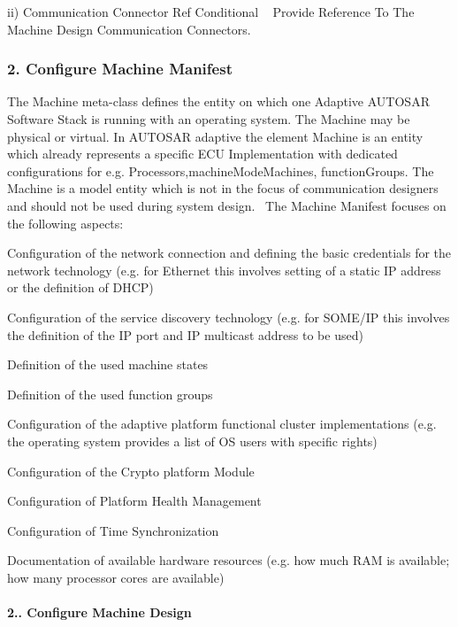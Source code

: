 ii) Communication Connector Ref Conditional ~\newline
 Provide Reference To The Machine Design Communication Connectors.

 \subsubsection*{2. Configure Machine Manifest}

The Machine meta-\/class defines the entity on which one Adaptive A\+U\+T\+O\+S\+AR Software Stack is running with an operating system. The Machine may be physical or virtual. In A\+U\+T\+O\+S\+AR adaptive the element Machine is an entity which already represents a specific E\+CU Implementation with dedicated configurations for e.\+g. Processors,machine\+Mode\+Machines, function\+Groups. The Machine is a model entity which is not in the focus of communication designers and should not be used during system design.~\newline
 The Machine Manifest focuses on the following aspects\+:
\begin{DoxyItemize}
\item Configuration of the network connection and defining the basic credentials for the network technology (e.\+g. for Ethernet this involves setting of a static IP address or the definition of D\+H\+CP)
\item Configuration of the service discovery technology (e.\+g. for S\+O\+M\+E/\+IP this involves the definition of the IP port and IP multicast address to be used)
\item Definition of the used machine states
\item Definition of the used function groups
\item Configuration of the adaptive platform functional cluster implementations (e.\+g. the operating system provides a list of OS users with specific rights)
\item Configuration of the Crypto platform Module
\item Configuration of Platform Health Management
\item Configuration of Time Synchronization
\item Documentation of available hardware resources (e.\+g. how much R\+AM is available; how many processor cores are available)
\end{DoxyItemize}

\paragraph*{2.. Configure Machine Design}


